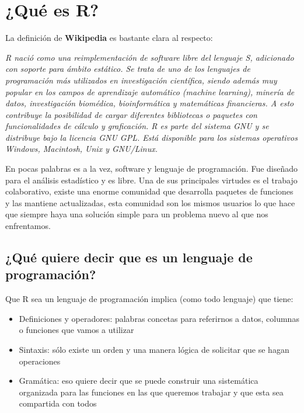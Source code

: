 \documentclass[
]{book}
\providecommand{\tightlist}{%
  \setlength{\itemsep}{0pt}\setlength{\parskip}{0pt}}
\begin{document}
\hypertarget{quuxe9-es-r}{%
\section{¿Qué es R?}\label{quuxe9-es-r}}

La definición de \textbf{Wikipedia} es bastante clara al respecto:

\emph{R nació como una reimplementación de software libre del lenguaje S, adicionado con soporte para ámbito estático. Se trata de uno de los lenguajes de programación más utilizados en investigación científica, siendo además muy popular en los campos de aprendizaje automático (machine learning), minería de datos, investigación biomédica, bioinformática y matemáticas financieras. A esto contribuye la posibilidad de cargar diferentes bibliotecas o paquetes con funcionalidades de cálculo y graficación. R es parte del sistema GNU y se distribuye bajo la licencia GNU GPL. Está disponible para los sistemas operativos Windows, Macintosh, Unix y GNU/Linux.}

En pocas palabras es a la vez, software y lenguaje de programación. Fue diseñado para el análisis estadístico y es libre. Una de sus principales virtudes es el trabajo colaborativo, existe una enorme comunidad que desarrolla paquetes de funciones y las mantiene actualizadas, esta comunidad son los mismos usuarios lo que hace que siempre haya una solución simple para un problema nuevo al que nos enfrentamos.

\hypertarget{quuxe9-quiere-decir-que-es-un-lenguaje-de-programaciuxf3n}{%
\subsection{¿Qué quiere decir que es un lenguaje de programación?}\label{quuxe9-quiere-decir-que-es-un-lenguaje-de-programaciuxf3n}}

Que R sea un lenguaje de programación implica (como todo lenguaje) que tiene:

\begin{itemize}
\tightlist
\item
  Definiciones y operadores: palabras concetas para referirnos a datos, columnas o funciones que vamos a utilizar
\item
  Sintaxis: sólo existe un orden y una manera lógica de solicitar que se hagan operaciones
\item
  Gramática: eso quiere decir que se puede construir una sistemática organizada para las funciones en las que queremos trabajar y que esta sea compartida con todos
\end{itemize}
\end{document}
